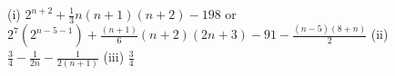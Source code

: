 \item (i) $2^{n+2}+\frac{1}{3}n\left(n+1\right)\left(n+2\right)-198$ or
$2^{7}\left(2^{n-5-1}\right)+\frac{\left(n+1\right)}{6}\left(n+2\right)\left(2n+3\right)-91-\frac{\left(n-5\right)\left(8+n\right)}{2}$
(ii) $\frac{3}{4}-\frac{1}{2n}-\frac{1}{2(n+1)}$ (iii) $\frac{3}{4}$